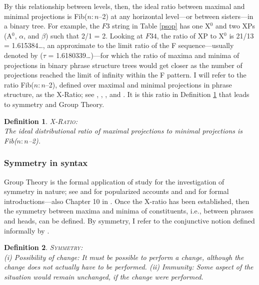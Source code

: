\documentclass[11pt,twoside]{article}
\theoremstyle{plain}
\newtheorem{definition}{Definition}
\numberwithin{equation}{section}
\theoremstyle{definition}
\newtheorem{phrase string}{Phrase String}
\begin{document}
By this relationship between levels, then, the ideal ratio between maximal and minimal projections is Fib($n : n$--2) at any horizontal level---or between sisters---in a binary tree. For example, the $F3$ string in Table \ref{psop} has one X$^{0}$ and two XPs (A$^{0}$, $\alpha$, and $\beta$) such that 2/1 = 2. Looking at $F34$, the  ratio of XP to X$^{0}$ is 21/13 = 1.615384\dots, an approximate to the limit ratio of the F sequence---usually denoted by ($\tau$ = 1.6180339\dots)---for which the ratio of maxima and minima of projections in binary phrase structure trees would get closer as the number of projections reached the limit of infinity within the F pattern. I will refer to the ratio Fib($n : n$--2), defined over maximal and minimal projections in phrase structure, as the X-Ratio; see \cite{cm:2005}, \cite{bcm:2006}, \cite{medeiros:2008}, and \cite{soschen:2008}. It is this ratio in Definition \ref{xratio} that leads to symmetry and Group Theory.

\begin{definition}
\textsc{X-Ratio:}\\ 
The ideal distributional ratio of maximal projections to minimal projections is\\ \mbox{Fib($n : n$--2)}.\label{xratio}
\end{definition}


\subsubsection{Symmetry in syntax}
Group Theory is the formal application of study for the investigation of symmetry in nature; see \cite{livio:2005} and \cite{stewart:2007} for popularized accounts and \cite{rosen:1995} and \cite{milne:2008} for formal introductions---also Chapter 10 in \cite{pmw:1990}. Once the X-ratio has been established, then the symmetry between maxima and minima of constituents, i.e., between phrases and heads, can be defined. By symmetry, I refer to the conjunctive notion defined informally by \cite{rosen:1995}. 


\begin{definition}
\textsc{Symmetry:}\\
(i) Possibility of change:  
It must be possible to perform a change, although the change does not actually have to be performed.
(ii) Immunity: 
Some aspect of the situation would remain unchanged, if the change were performed. 
\end{definition}
\end{document}

